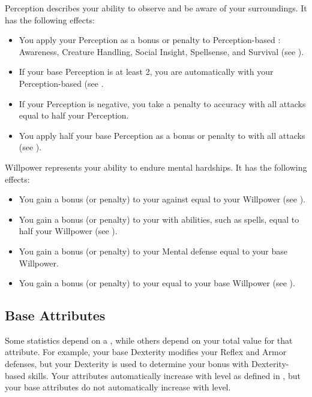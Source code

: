         \label{Perception}
        {
            Perception describes your ability to observe and be aware of your surroundings.
            It has the following effects:
            \begin{itemize}
                \item You apply your Perception as a bonus or penalty to Perception-based : Awareness, Creature Handling, Social Insight, Spellsense, and Survival (see ).
                \item If your base Perception is at least 2, you are automatically  with your Perception-based  (see .
                \item If your Perception is negative, you take a penalty to accuracy with all attacks equal to half your Perception.
                \item You apply half your base Perception as a bonus or penalty to  with all attacks (see ).
            \end{itemize}
        }

        \label{Willpower}
        {
            Willpower represents your ability to endure mental hardships.
            It has the following effects:
            \begin{itemize}
                \item You gain a bonus (or penalty) to your  against  equal to your Willpower (see ).
                \item You gain a bonus (or penalty) to your  with  abilities, such as spells, equal to half your Willpower (see ).
                \item You gain a bonus (or penalty) to your Mental defense equal to your base Willpower.
                \item You gain a bonus (or penalty) to your  equal to your base Willpower (see ).
            \end{itemize}
        }

    \subsection{Base Attributes}\label{Base Attributes}
        Some statistics depend on a , while others depend on your total value for that attribute.
        For example, your base Dexterity modifies your Reflex and Armor defenses, but your Dexterity is used to determine your bonus with Dexterity-based skills.
        Your attributes automatically increase with level as defined in , but your base attributes do not automatically increase with level.

